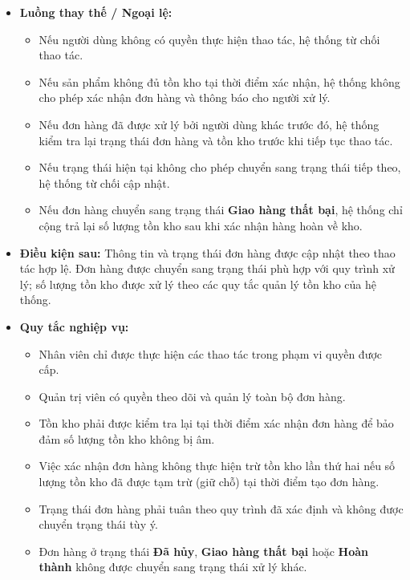 \documentclass[12pt,a4paper]{article}
\begin{document}
\begin{itemize}
\item \textbf{Luồng thay thế / Ngoại lệ:}

\begin{itemize}

    \item Nếu người dùng không có quyền thực hiện thao tác, hệ thống từ chối thao tác.

    \item Nếu sản phẩm không đủ tồn kho tại thời điểm xác nhận, hệ thống không cho phép xác nhận đơn hàng và thông báo cho người xử lý.

    \item Nếu đơn hàng đã được xử lý bởi người dùng khác trước đó, hệ thống kiểm tra lại trạng thái đơn hàng và tồn kho trước khi tiếp tục thao tác.

    \item Nếu trạng thái hiện tại không cho phép chuyển sang trạng thái tiếp theo, hệ thống từ chối cập nhật.

    \item Nếu đơn hàng chuyển sang trạng thái \textbf{Giao hàng thất bại}, hệ thống chỉ cộng trả lại số lượng tồn kho sau khi xác nhận hàng hoàn về kho.

\end{itemize}

\item \textbf{Điều kiện sau:} Thông tin và trạng thái đơn hàng được cập nhật theo thao tác hợp lệ. Đơn hàng được chuyển sang trạng thái phù hợp với quy trình xử lý; số lượng tồn kho được xử lý theo các quy tắc quản lý tồn kho của hệ thống.

\item \textbf{Quy tắc nghiệp vụ:}

\begin{itemize}

    \item Nhân viên chỉ được thực hiện các thao tác trong phạm vi quyền được cấp.

    \item Quản trị viên có quyền theo dõi và quản lý toàn bộ đơn hàng.

    \item Tồn kho phải được kiểm tra lại tại thời điểm xác nhận đơn hàng để bảo đảm số lượng tồn kho không bị âm.

    \item Việc xác nhận đơn hàng không thực hiện trừ tồn kho lần thứ hai nếu số lượng tồn kho đã được tạm trừ (giữ chỗ) tại thời điểm tạo đơn hàng.

    \item Trạng thái đơn hàng phải tuân theo quy trình đã xác định và không được chuyển trạng thái tùy ý.

    \item Đơn hàng ở trạng thái \textbf{Đã hủy}, \textbf{Giao hàng thất bại} hoặc \textbf{Hoàn thành} không được chuyển sang trạng thái xử lý khác.

\end{itemize}

\end{itemize}
\end{document}
